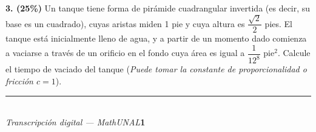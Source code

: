 \documentclass[11pt]{article}
\begin{document}
\newpage

\noindent\textbf{3. (25\%)} Un tanque tiene forma de pirámide cuadrangular invertida (es decir, su base es un cuadrado), cuyas aristas miden 1 pie y cuya altura es $\dfrac{\sqrt{2}}{2}$ pies. El tanque está inicialmente lleno de agua, y a partir de un momento dado comienza a vaciarse a través de un orificio en el fondo cuya área es igual a $\dfrac{1}{12^8}$ pie$^2$. Calcule el tiempo de vaciado del tanque (\textit{Puede tomar la constante de proporcionalidad o fricción $c=1$}).

\begin{center}
\end{center}

\vspace{5cm}

\vfill
\rule{\linewidth}{0.4pt}\\[1pt]
{\scriptsize\textit{Transcripción digital --- MathUNAL}\hfill\textcolor{unalblue}{\textbf{1}}}
\end{document}
